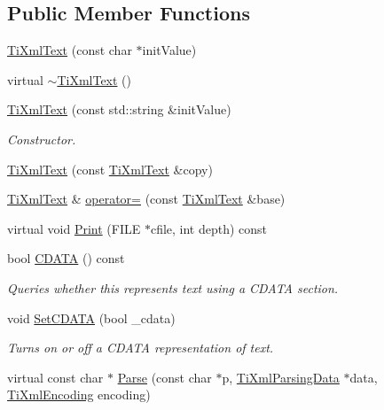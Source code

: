 \subsection*{Public Member Functions}
\begin{DoxyCompactItemize}
\item 
\hyperlink{class_ti_xml_text_af659e77c6b87d684827f35a8f4895960}{Ti\-Xml\-Text} (const char $\ast$init\-Value)
\item 
virtual \hyperlink{class_ti_xml_text_a829a4bd2d8d2461c333eb4f3f5b1b3d2}{$\sim$\-Ti\-Xml\-Text} ()
\item 
\hyperlink{class_ti_xml_text_a439792f6183a3d3fb6f2bc2b16fa5691}{Ti\-Xml\-Text} (const std\-::string \&init\-Value)
\begin{DoxyCompactList}\small\item\em Constructor. \end{DoxyCompactList}\item 
\hyperlink{class_ti_xml_text_a8d2cc1b4af2208cbb0171cf20f6815d1}{Ti\-Xml\-Text} (const \hyperlink{class_ti_xml_text}{Ti\-Xml\-Text} \&copy)
\item 
\hyperlink{class_ti_xml_text}{Ti\-Xml\-Text} \& \hyperlink{class_ti_xml_text_aed5b13f9c1b804c616fd533882c29f57}{operator=} (const \hyperlink{class_ti_xml_text}{Ti\-Xml\-Text} \&base)
\item 
virtual void \hyperlink{class_ti_xml_text_ae74d56c5b3ddec6cc3103dd51821af92}{Print} (F\-I\-L\-E $\ast$cfile, int depth) const 
\item 
bool \hyperlink{class_ti_xml_text_ad1a6a6b83fa2271022dd97c072a2b586}{C\-D\-A\-T\-A} () const 
\begin{DoxyCompactList}\small\item\em Queries whether this represents text using a C\-D\-A\-T\-A section. \end{DoxyCompactList}\item 
void \hyperlink{class_ti_xml_text_acb17ff7c5d09b2c839393445a3de5ea9}{Set\-C\-D\-A\-T\-A} (bool \-\_\-cdata)
\begin{DoxyCompactList}\small\item\em Turns on or off a C\-D\-A\-T\-A representation of text. \end{DoxyCompactList}\item 
virtual const char $\ast$ \hyperlink{class_ti_xml_text_a8d2dcfa41fc73d3e62dacc2fcf633819}{Parse} (const char $\ast$p, \hyperlink{class_ti_xml_parsing_data}{Ti\-Xml\-Parsing\-Data} $\ast$data, \hyperlink{tinyxml_8h_a88d51847a13ee0f4b4d320d03d2c4d96}{Ti\-Xml\-Encoding} encoding)

\end{DoxyCompactItemize}
